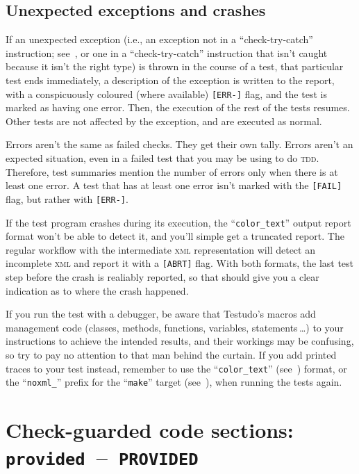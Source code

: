 \documentclass[twoside, a4paper, article]{memoir}
\newcommand*\testudocolor{\color{red!80!blue}}
\newcommand*\testudo[1]{\texttt{\testudocolor{}#1}}
\newcommand*\testudopair[2]{\testudo{#1}~--~\testudo{#2}}
\newcommand\chaptertestudopair[3]{%
  \chapter[#1]{#1: \testudopair{#2}{#3}}}
\providecommand\typesetexample[1]{%
}
\newcommand*\ellipsis{\,\ldots}
\begin{document}
\typesetexample{tfos-to-text}


\section{Unexpected exceptions and crashes}
\label{sec:unexpected-exceptions-crashes}

If an unexpected exception (i.e., an exception not in a ``check-try-catch''
instruction; see~, or one in a ``check-try-catch''
instruction that isn't caught because it isn't the right type) is thrown in the
course of a test, that particular test ends immediately, a description of the
exception is written to the report, with a conspicuously coloured (where
available) \verb|[ERR-]| flag, and the test is marked as having one error.
Then, the execution of the rest of the tests resumes.  Other tests are not
affected by the exception, and are executed as normal.

Errors aren't the same as failed checks.  They get their own tally.  Errors
aren't an expected situation, even in a failed test that you may be using to do
\textsc{tdd}.  Therefore, test summaries mention the number of errors only
when there is at least one error.  A test that has at least one error isn't
marked with the \verb|[FAIL]| flag, but rather with \verb|[ERR-]|.

If the test program crashes during its execution, the ``\texttt{color\_text}''
output report format won't be able to detect it, and you'll simple get a
truncated report.  The regular workflow with the intermediate \textsc{xml}
representation will detect an incomplete \textsc{xml} and report it with a
\verb|[ABRT]| flag.  With both formats, the last test step before the crash is
realiably reported, so that should give you a clear indication as to where the
crash happened.

If you run the test with a debugger, be aware that Testudo's macros add
management code (classes, methods, functions, variables, statements\ellipsis{})
to your instructions to achieve the intended results, and their workings may be
confusing, so try to pay no attention to that man behind the curtain.  If you
add printed traces to your test instead, remember to use the
``\texttt{color\_text}'' (see~) format, or the
``\texttt{noxml\_}'' prefix for the ``\texttt{make}'' target
(see~), when running the tests again.


\chaptertestudopair{Check-guarded code sections}{provided}{PROVIDED}
\label{cha:check-guarded-code-sections}
\end{document}
